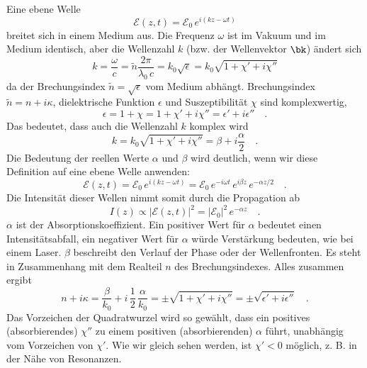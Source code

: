Eine ebene Welle 
\begin{equation}
    \mathcal{E}(z,t) =  \mathcal{E}_0 \,  e^{ i (k z - \omega t)} 
\end{equation}
breitet sich in einem Medium aus. Die Frequenz $\omega$ ist im Vakuum und im Medium identisch, aber die Wellenzahl $k$ (bzw. der Wellenvektor $\bk$) ändert sich
\begin{equation}
    k = \frac{\omega}{c} = \tilde{n} \frac{2 \pi }{\lambda_0 \, c} = k_0 \sqrt{\epsilon} = k_0 \sqrt{1 + \chi' + i \chi''} 
\end{equation}
da der Brechungsindex $\tilde{n} = \sqrt{\epsilon}$ vom Medium abhängt. Brechungsindex $\tilde{n} = n + i \kappa$, dielektrische Funktion $\epsilon$ und   Suszeptibilität $\chi$ sind komplexwertig,
\begin{equation}
    \epsilon = 1 + \chi = 1 + \chi' + i \chi'' = \epsilon' + i \epsilon'' \quad .
\end{equation}
Das bedeutet, dass auch die Wellenzahl $k$ komplex wird
\begin{equation}
    k =  k_0 \sqrt{1 + \chi' + i \chi''} = \beta + i \frac{\alpha}{2} \quad .
\end{equation}
Die Bedeutung der reellen Werte $\alpha$ und $\beta$ wird deutlich, wenn wir diese Definition auf eine ebene Welle anwenden:
\begin{equation}
    \mathcal{E}(z,t) =  \mathcal{E}_0 \,  e^{ i (k z - \omega t)} =
     \mathcal{E}_0 \, e^{-i \omega t} \, e^{i \beta z} \, e^{- \alpha z / 2} \quad .
\end{equation}
Die Intensität dieser Wellen nimmt somit durch die Propagation ab
\begin{equation}
    I(z) \propto |\mathcal{E}(z,t) |^2 = |\mathcal{E}_0|^2 \, e^{- \alpha z} \quad .
\end{equation}
$\alpha$ ist  der Absorptionskoeffizient. Ein positiver Wert für $\alpha$ bedeutet einen Intensitätsabfall, ein negativer Wert für $\alpha$ würde Verstärkung bedeuten, wie bei einem Laser. $\beta$ beschreibt den Verlauf der Phase oder der Wellenfronten. Es steht in Zusammenhang mit dem Realteil $n$ des Brechungsindexes. Alles zusammen ergibt
\begin{equation}
    n + i \kappa = \frac{\beta}{k_0} + i \, \frac{1}{2} \, \frac{\alpha}{k_0} = \pm \sqrt{1 + \chi' + i \chi''}
    = \pm \sqrt{\epsilon' + i \epsilon''} \quad .
    \label{eq:4_n_chi}
\end{equation}
Das Vorzeichen der Quadratwurzel wird so gewählt, dass ein positives (absorbierendes) $\chi''$ zu einem positiven (absorbierenden) $\alpha$ führt, unabhängig vom Vorzeichen von $\chi'$. Wie wir gleich sehen werden, ist $\chi' < 0$ möglich, z. B. in der Nähe von Resonanzen.


